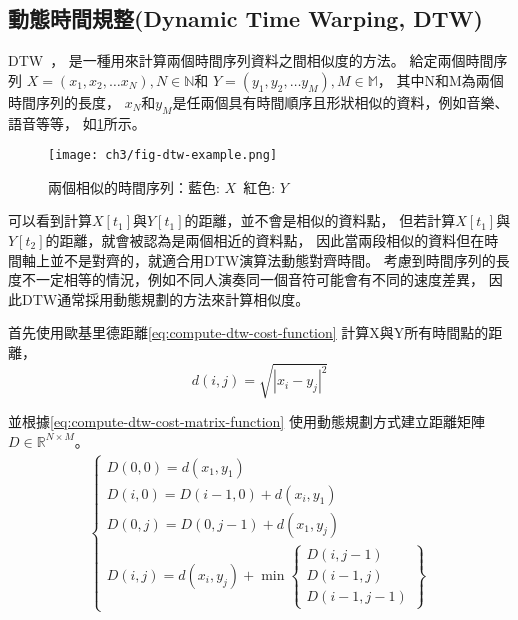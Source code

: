 \documentclass[class=NCU_thesis, crop=false]{standalone}
\begin{document}
\subsection{動態時間規整(Dynamic Time Warping, DTW)} \label{ch3-subst-DTW}
DTW~\cite{Sakoe1978Dynamic}，
是一種用來計算兩個時間序列資料之間相似度的方法。
給定兩個時間序列
$X = (x_1, x_2, \dots x_N), N \in \mathbb{N}$和
$Y = (y_1, y_2, \dots y_M), M \in \mathbb{M}$，
其中N和M為兩個時間序列的長度，
$x_N$和$y_M$是任兩個具有時間順序且形狀相似的資料，例如音樂、語音等等，
如\cref{fig:fig-ch3-dtw-example}所示。
\begin{figure}[!hbt]
    \centering
    \texttt{[image: ch3/fig-dtw-example.png]}
    \caption{兩個相似的時間序列：藍色: $X$\ 紅色: $Y$}
    \label{fig:fig-ch3-dtw-example}
\end{figure}

可以看到計算$X[t_1]$與$Y[t_1]$的距離，並不會是相似的資料點，
但若計算$X[t_1]$與$Y[t_2]$的距離，就會被認為是兩個相近的資料點，
因此當兩段相似的資料但在時間軸上並不是對齊的，就適合用DTW演算法動態對齊時間。
考慮到時間序列的長度不一定相等的情況，例如不同人演奏同一個音符可能會有不同的速度差異，
因此DTW通常採用動態規劃的方法來計算相似度。

首先使用歐基里德距離\cref{eq:compute-dtw-cost-function}
計算X與Y所有時間點的距離，
\begin{equation}
    \label{eq:compute-dtw-cost-function}
    d(i, j) = \sqrt{\left\lvert x_i-y_j\right\rvert^{2}}
\end{equation}

並根據\cref{eq:compute-dtw-cost-matrix-function}
使用動態規劃方式建立距離矩陣$D \in \mathbb{R}^{N \times M}$。
\begin{align}
    \label{eq:compute-dtw-cost-matrix-function}
    \left\{
        \begin{array}{l}
            D(0, 0) = d(x_1, y_1)\\
            D(i, 0) = D(i-1, 0)+d(x_i, y_1)\\
            D(0, j) = D(0, j-1)+d(x_1, y_j)\\
            D(i, j) = d(x_i, y_j) + \min \left\{
                \begin{array}{l}
                    D(i, j-1) \\
                    D(i-1, j) \\
                    D(i-1, j-1)
                \end{array}\right\}
        \end{array}
    \right.
\end{align}
\end{document}
